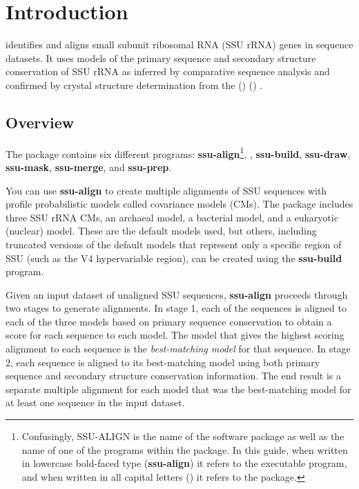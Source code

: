 \section{Introduction}

 identifies and aligns small subunit ribosomal RNA
(SSU rRNA) genes in sequence datasets. It uses models of the primary
sequence and secondary structure conservation of SSU rRNA as inferred
by comparative sequence analysis and confirmed by crystal structure
determination from the  () 
()
\cite{CannoneGutell02}.

\subsection{Overview}
The  package contains six different
programs: \textbf{ssu-align}\footnote{Confusingly, SSU-ALIGN is the name of the
  software package as well as the name of one of the programs within
  the package. In this guide, when written in lowercase bold-faced
  type (\textbf{ssu-align}) it refers to the executable program, and
  when written in all capital letters () it refers to
  the package.}, 
, \textbf{ssu-build}, \textbf{ssu-draw}, 
\textbf{ssu-mask}, \textbf{ssu-merge}, and \textbf{ssu-prep}. 

You can use \textbf{ssu-align} to create multiple alignments of SSU
sequences with profile probabilistic models called covariance models
(CMs). The package includes three SSU rRNA CMs, an archaeal model,
a bacterial model, and a eukaryotic (nuclear) model. These are the
default models used, but others, including truncated versions of the
default models that represent only a specific region of SSU (such as
the V4 hypervariable region), can be created using the
\textbf{ssu-build} program.

Given an input dataset of unaligned SSU sequences, \textbf{ssu-align}
proceeds through two stages to generate
alignments. In stage 1, each of the sequences is aligned to each of
the three models based on primary sequence conservation to obtain a
score for each sequence to each model.  The model that gives the
highest scoring alignment to each sequence is the \emph{best-matching
  model} for that sequence.  In stage 2, each sequence is aligned to
its best-matching model using both primary sequence and secondary
structure conservation information. The end result is a separate
multiple alignment for each model that was the best-matching model for
at least one sequence in the input dataset.

